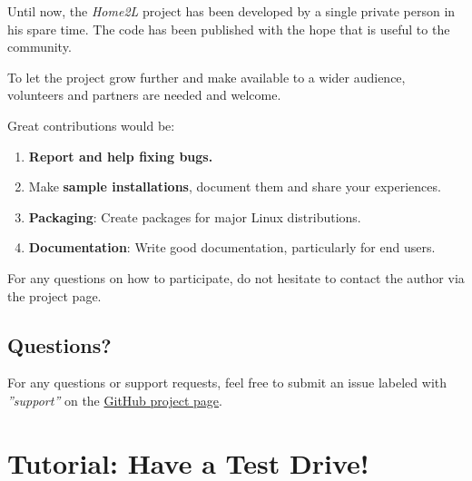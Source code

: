 \documentclass[12pt,english,parskip=half,headheight=19pt]{scrreprt}
\begin{document}
Until now, the \textit{Home2L} project has been developed by a single private person
in his spare time. The code has been published with the hope that is useful to
the community.

To let the project grow further and make available to a wider audience,
volunteers and partners are needed and welcome.

Great contributions would be:

\begin{enumerate}

  \item \textbf{Report and help fixing bugs.}

  \item Make \textbf{sample installations}, document them and share your experiences.

  \item \textbf{Packaging}: Create packages for major Linux distributions.

  \item \textbf{Documentation}: Write good documentation, particularly for end users.

\end{enumerate}

For any questions on how to participate, do not hesitate to contact the author
via the project page.



\section{Questions?}
\label{sec:support}


For any questions or support requests, feel free to submit an issue labeled with \textit{''support''} on the \href{https://github.com/gkiefer/home2l/issues}{GitHub project page}.





%
%
\chapter{Tutorial: Have a Test Drive!}
\label{ch:tutorial}
%
%
\end{document}
